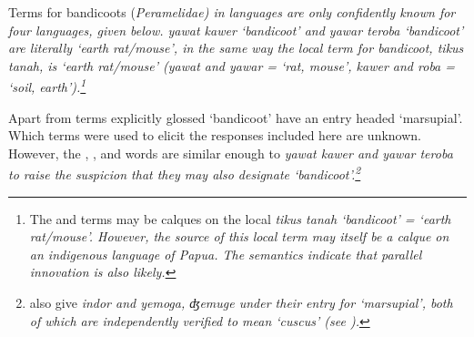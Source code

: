 Terms for bandicoots (\it{Peramelidae}) in 
languages are only confidently known for four languages, given below.
 \it{yawat kawer} ‘bandicoot’
and  \it{yawar teroba} ‘bandicoot’ are literally ‘earth rat/mouse’,
in the same way the local  term for bandicoot,
\it{tikus tanah}, is ‘earth rat/mouse’ (\it{yawat}
and \it{yawar} = ‘rat,
mouse’, \it{kawer} and \it{roba} = ‘soil, earth’).\footnote{
		The 
		and  terms may be calques on the local  \it{tikus tanah}
		‘bandicoot’ = ‘earth rat/mouse’.
		However, the source of this local  term may itself be
		a calque on an indigenous language of Papua.
		The semantics indicate that
		parallel innovation is also likely.}

Apart from terms explicitly glossed ‘bandicoot’ \citet[237]{SmitsVoorhoeve1992a}
have an entry headed ‘marsupial’.
Which  terms were used to elicit the responses included here are unknown.
However, the , ,
and  words are similar enough to  \it{yawat
kawer} and  \it{yawar teroba} to raise the suspicion
that they may also designate ‘bandicoot’.\footnote{
		\citet[237]{SmitsVoorhoeve1992a} also give  \it{indor}
		and  \it{yemoga}, \it{ʤemuge} under their entry for ‘marsupial’,
		both of which are independently verified to mean ‘cuscus’ (see
		).}
\\

